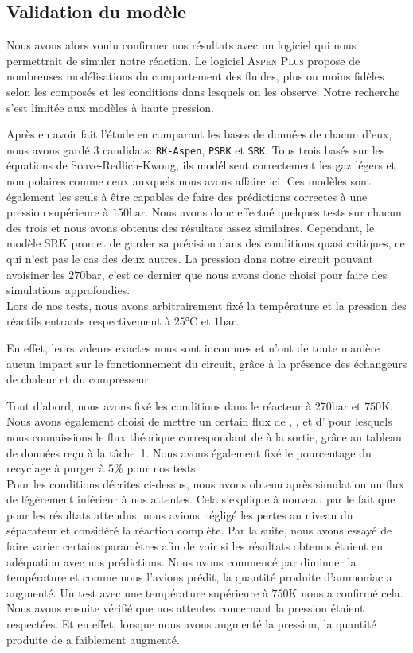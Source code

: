 \subsection{Validation du modèle}

Nous avons alors voulu confirmer nos résultats avec un logiciel 
qui nous permettrait de simuler notre réaction. 
Le logiciel \textsc{Aspen Plus} propose de nombreuses 
modélisations du comportement des fluides, 
plus ou moins fidèles selon les composés et 
les conditions dans lesquels on les observe. 
Notre recherche s'est limitée aux modèles à haute pression. 

Après en avoir fait l'étude en comparant les bases de données de chacun d'eux, 
nous avons gardé 3 candidats: \texttt{RK-Aspen}, \texttt{PSRK} et \texttt{SRK}. 
Tous trois basés sur les équations de Soave-Redlich-Kwong, 
ils modélisent correctement les gaz légers et non polaires 
comme ceux auxquels nous avons affaire ici. 
Ces modèles sont également les seuls à être capables de faire 
des prédictions correctes à une pression supérieure à $150\si{\bar}$. 
Nous avons donc effectué quelques tests sur chacun des trois 
et nous avons obtenus des résultats assez similaires.
Cependant, le modèle SRK promet de garder sa précision dans des conditions 
quasi critiques, ce qui n'est pas le cas des deux autres. 
La pression dans notre circuit pouvant avoisiner les $270\si{\bar}$, 
c'est ce dernier que nous avons donc choisi pour faire des simulations approfondies.\\
Lors de nos tests, nous avons arbitrairement fixé la température et 
la pression des réactifs entrants respectivement à $25\si{\degreeCelsius}$ et $1\si{\bar}$.

En effet, leurs valeurs exactes nous sont inconnues et n'ont de toute manière 
aucun impact sur le fonctionnement du circuit, grâce à la présence des échangeurs de chaleur 
et du compresseur.

Tout d'abord, nous avons fixé les conditions dans le réacteur à $270\si{\bar}$ 
et $750\si{\kelvin}$. 
Nous avons également choisi de mettre un certain flux de , , et d'  
pour lesquels nous connaissions le flux théorique correspondant de  à la sortie,
grâce au tableau de données reçu à la tâche~1. 
Nous avons également fixé le pourcentage du recyclage à purger à $5\%$ pour nos tests.\\

Pour les conditions décrites ci-dessus, 
nous avons obtenu après simulation un flux de  légèrement inférieur à nos attentes. 
Cela s'explique à nouveau par le fait que pour les résultats attendus, 
nous avions négligé les pertes au niveau du séparateur et considéré la réaction complète.
Par la suite, nous avons essayé de faire varier certains paramètres afin 
de voir si les résultats obtenus étaient en adéquation avec nos prédictions. 
Nous avons commencé par diminuer la température et comme nous l'avions prédit, 
la quantité produite d'ammoniac a augmenté. 
Un test avec une température supérieure à $750\si{\kelvin}$ nous a confirmé cela. 
Nous avons ensuite vérifié que nos attentes concernant la pression étaient respectées. 
Et en effet, lorsque nous avons augmenté la pression, 
la quantité produite de  a faiblement augmenté.

